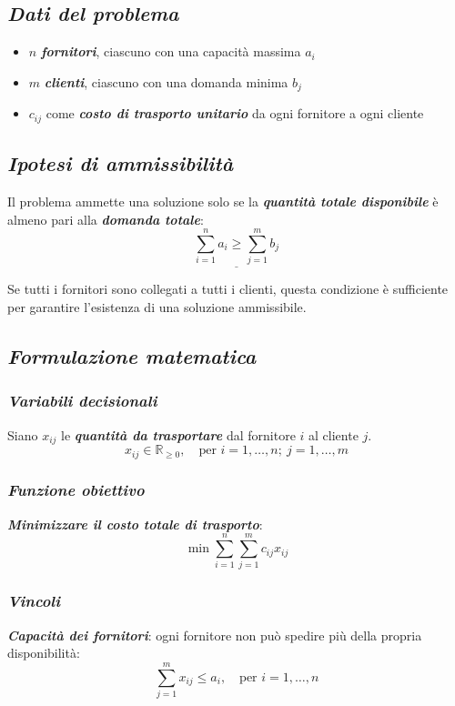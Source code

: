 \subsection{\textbf{\textit{Dati del problema}}}
\begin{itemize}
    \item $n$ \textbf{\textit{fornitori}}, ciascuno con una capacità massima $a_i$
    \item $m$ \textbf{\textit{clienti}}, ciascuno con una domanda minima $b_j$
    \item $c_{ij}$ come \textbf{\textit{costo di trasporto unitario}} da ogni fornitore a ogni cliente
\end{itemize}

\subsection{\textbf{\textit{Ipotesi di ammissibilità}}}
Il problema ammette una soluzione solo se la \textbf{\textit{quantità totale disponibile}} 
è almeno pari alla \textbf{\textit{domanda totale}}:
\[
\underline{\sum_{i=1}^{n} a_i \geq \sum_{j=1}^{m} b_j}
\]

Se tutti i fornitori sono collegati a tutti i clienti, questa condizione 
è sufficiente per garantire l'esistenza di una soluzione ammissibile.

\subsection{\textbf{\textit{Formulazione matematica}}}
\subsubsection{\textbf{\textit{Variabili decisionali}}}
Siano $x_{ij}$ le \textbf{\textit{quantità da trasportare}} dal fornitore $i$ al cliente $j$.
\[
x_{ij} \in \mathbb{R}_{\geq 0}, \quad \text{per } i = 1, \dots, n;\ j = 1, \dots, m
\]

\subsubsection{\textbf{\textit{Funzione obiettivo}}}
\textbf{\textit{Minimizzare il costo totale di trasporto}}:
\[
\min \sum_{i=1}^{n} \sum_{j=1}^{m} c_{ij} x_{ij}
\]

\subsubsection{\textbf{\textit{Vincoli}}}
\textbf{\textit{Capacità dei fornitori}}: ogni fornitore non può spedire più della propria disponibilità:
\[
\sum_{j=1}^{m} x_{ij} \leq a_i, \quad \text{per } i = 1, \dots, n
\]

